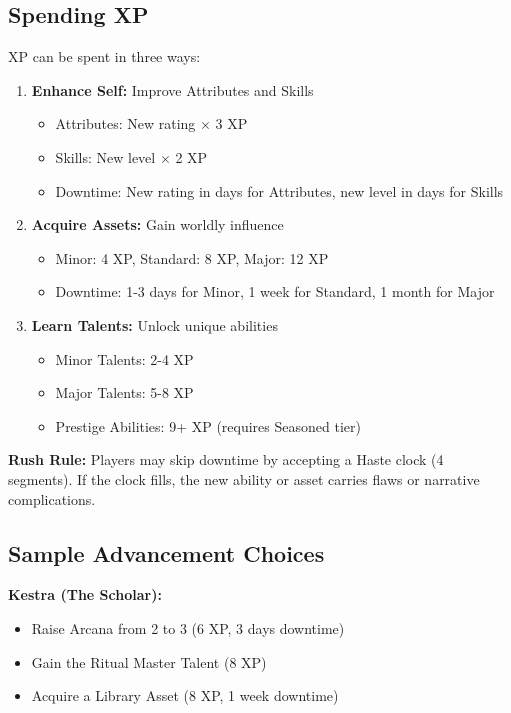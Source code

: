 \documentclass[11pt]{article}
\begin{document}
\subsection{Spending XP}

XP can be spent in three ways:
\begin{enumerate}
\item \textbf{Enhance Self:} Improve Attributes and Skills
   \begin{itemize}
   \item Attributes: New rating $\times$ 3 XP
   \item Skills: New level $\times$ 2 XP
   \item Downtime: New rating in days for Attributes, new level in days for Skills
   \end{itemize}
\item \textbf{Acquire Assets:} Gain worldly influence
   \begin{itemize}
   \item Minor: 4 XP, Standard: 8 XP, Major: 12 XP
   \item Downtime: 1-3 days for Minor, 1 week for Standard, 1 month for Major
   \end{itemize}
\item \textbf{Learn Talents:} Unlock unique abilities
   \begin{itemize}
   \item Minor Talents: 2-4 XP
   \item Major Talents: 5-8 XP
   \item Prestige Abilities: 9+ XP (requires Seasoned tier)
   \end{itemize}
\end{enumerate}

\textbf{Rush Rule:} Players may skip downtime by accepting a Haste clock (4 segments). If the clock fills, the new ability or asset carries flaws or narrative complications.

\subsection{Sample Advancement Choices}

\textbf{Kestra (The Scholar):}
\begin{itemize}
\item Raise Arcana from 2 to 3 (6 XP, 3 days downtime)
\item Gain the Ritual Master Talent (8 XP)
\item Acquire a Library Asset (8 XP, 1 week downtime)
\end{itemize}
\end{document}
